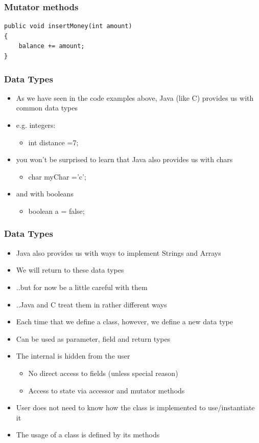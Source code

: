 \documentclass{beamer}
\begin{document}
\begin{frame}[fragile]
\frametitle{Mutator methods}
\begin{lstlisting}
public void insertMoney(int amount)‏
{
    balance += amount;
} 
\end{lstlisting}
\end{frame}

\begin{frame}
\frametitle{Data Types}
\begin{itemize}
\item As we have seen in the code examples above, Java (like C) provides us with common data types 
\item e.g. integers: 
\begin{itemize}
\item int distance =7;
\end{itemize}
\item you won't be surprised to learn that Java also provides us with chars
\begin{itemize}
\item char myChar ='c';
\end{itemize}
\item and with booleans
\begin{itemize}
\item boolean a = false; 
\end{itemize}
\end{itemize} 
\end{frame}

\begin{frame}
\frametitle{Data Types}
\begin{itemize}
\item Java also provides us with ways to implement Strings and Arrays
\item We will return to these data types
\item ..but for now be a little careful with them
\item ..Java and C treat them in rather different ways
\end{itemize} 
\end{frame}

\begin{frame}
\begin{itemize}
\item Each time that we define a class, however, we define a new data type
\item Can be used as parameter, field and return types
\item The internal is hidden from the user
\begin{itemize}
\item No direct access to fields (unless special reason)‏
\item Access to state via accessor and mutator methods
\end{itemize}
\item User does not need to know how the class is implemented to use/instantiate it
\item The usage of a class is defined by its methods
\end{itemize}
\end{frame}
\end{document}
